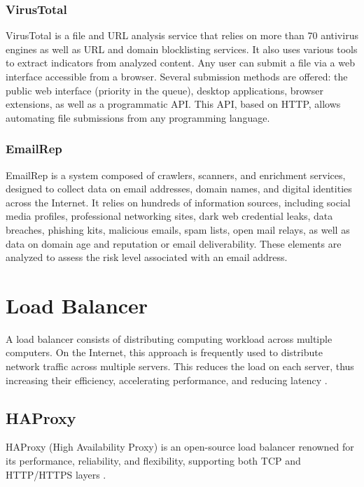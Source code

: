 \subsubsection{VirusTotal}

VirusTotal is a file and URL analysis service that relies on more than 70 antivirus engines as well as URL and domain blocklisting services. It also uses various tools to extract indicators from analyzed content. Any user can submit a file via a web interface accessible from a browser. Several submission methods are offered: the public web interface (priority in the queue), desktop applications, browser extensions, as well as a programmatic API. This API, based on HTTP, allows automating file submissions from any programming language.


\subsubsection{EmailRep}

EmailRep is a system composed of crawlers, scanners, and enrichment services, designed to collect data on email addresses, domain names, and digital identities across the Internet. It relies on hundreds of information sources, including social media profiles, professional networking sites, dark web credential leaks, data breaches, phishing kits, malicious emails, spam lists, open mail relays, as well as data on domain age and reputation or email deliverability. These elements are analyzed to assess the risk level associated with an email address.

\section{Load Balancer}
\label{sec:loadbalancer}

A load balancer consists of distributing computing workload across multiple computers. On the Internet, this approach is frequently used to distribute network traffic across multiple servers. This reduces the load on each server, thus increasing their efficiency, accelerating performance, and reducing latency \cite{loadbalancer}.

\subsection{HAProxy}
\label{subsec:haproxy}

HAProxy (High Availability Proxy) is an open-source load balancer renowned for its performance, reliability, and flexibility, supporting both TCP and HTTP/HTTPS layers \cite{haproxy-docs}.

